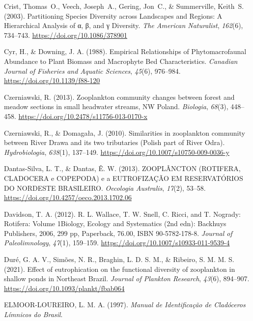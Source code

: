 \documentclass[
  letterpaper,
  DIV=11,
  numbers=noendperiod]{scrartcl}
\newlength{\cslhangindent}
\newenvironment{CSLReferences}[2] %
 {\begin{list}{}{%
  \setlength{\itemindent}{0pt}
  \setlength{\leftmargin}{0pt}
  \setlength{\parsep}{0pt}
  \ifodd #1
   \setlength{\leftmargin}{\cslhangindent}
   \setlength{\itemindent}{-1\cslhangindent}
  \fi
  \setlength{\itemsep}{#2\baselineskip}}}
 {\end{list}}
\begin{document}
\begin{CSLReferences}{1}{0}
Crist, Thomas~O., Veech, Joseph~A., Gering, Jon~C., \& Summerville,
Keith~S. (2003). Partitioning Species Diversity across Landscapes and
Regions: A Hierarchical Analysis of α, β, and γ Diversity. \emph{The
American Naturalist}, \emph{162}(6), 734--743.
\url{https://doi.org/10.1086/378901}

Cyr, H., \& Downing, J. A. (1988). Empirical Relationships of
Phytomacrofaunal Abundance to Plant Biomass and Macrophyte Bed
Characteristics. \emph{Canadian Journal of Fisheries and Aquatic
Sciences}, \emph{45}(6), 976--984. \url{https://doi.org/10.1139/f88-120}

Czerniawski, R. (2013). Zooplankton community changes between forest and
meadow sections in small headwater streams, NW Poland. \emph{Biologia},
\emph{68}(3), 448--458. \url{https://doi.org/10.2478/s11756-013-0170-x}

Czerniawski, R., \& Domagała, J. (2010). Similarities in zooplankton
community between River Drawa and its two tributaries (Polish part of
River Odra). \emph{Hydrobiologia}, \emph{638}(1), 137--149.
\url{https://doi.org/10.1007/s10750-009-0036-y}

Dantas-Silva, L. T., \& Dantas, Ê. W. (2013). ZOOPLÂNCTON (ROTIFERA,
CLADOCERA e COPEPODA) e a EUTROFIZAÇÃO EM RESERVATÓRIOS DO NORDESTE
BRASILEIRO. \emph{Oecologia Australis}, \emph{17}(2), 53--58.
\url{https://doi.org/10.4257/oeco.2013.1702.06}

Davidson, T. A. (2012). R. L. Wallace, T. W. Snell, C. Ricci, and T.
Nogrady: Rotifera: Volume 1{\textemdash}Biology, Ecology and Systematics
(2nd edn): Backhuys Publishers, 2006, 299 pp, Paperback,
{\mbox{\texteuro}}76.00, ISBN 90-5782-178-8. \emph{Journal of
Paleolimnology}, \emph{47}(1), 159--159.
\url{https://doi.org/10.1007/s10933-011-9539-4}

Duré, G. A. V., Simões, N. R., Braghin, L. D. S. M., \& Ribeiro, S. M.
M. S. (2021). Effect of eutrophication on the functional diversity of
zooplankton in shallow ponds in Northeast Brazil. \emph{Journal of
Plankton Research}, \emph{43}(6), 894--907.
\url{https://doi.org/10.1093/plankt/fbab064}

ELMOOR-LOUREIRO, L. M. A. (1997). \emph{Manual de Identificação de
Cladóceros Límnicos do Brasil}.


\end{CSLReferences}
\end{document}
